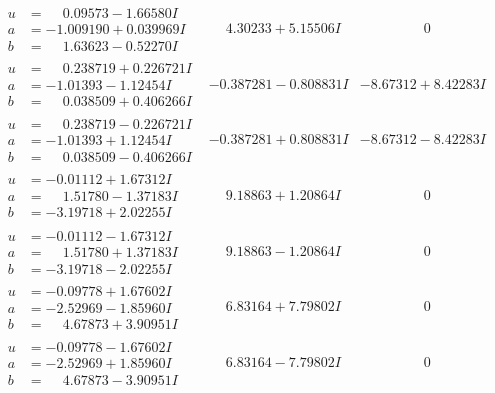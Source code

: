 \documentclass[1p]{elsarticle_modified}
\theoremstyle{definition}
\begin{document}
$$\begin{array}{c|c|c}
\begin{aligned}
u &= \phantom{-}0.09573 - 1.66580 I \\
a &= -1.009190 + 0.039969 I \\
b &= \phantom{-}1.63623 - 0.52270 I\end{aligned}
 & \phantom{-}4.30233 + 5.15506 I & \phantom{-0.000000 } 0 \\ \hline\begin{aligned}
u &= \phantom{-}0.238719 + 0.226721 I \\
a &= -1.01393 - 1.12454 I \\
b &= \phantom{-}0.038509 + 0.406266 I\end{aligned}
 & -0.387281 - 0.808831 I & -8.67312 + 8.42283 I \\ \hline\begin{aligned}
u &= \phantom{-}0.238719 - 0.226721 I \\
a &= -1.01393 + 1.12454 I \\
b &= \phantom{-}0.038509 - 0.406266 I\end{aligned}
 & -0.387281 + 0.808831 I & -8.67312 - 8.42283 I \\ \hline\begin{aligned}
u &= -0.01112 + 1.67312 I \\
a &= \phantom{-}1.51780 - 1.37183 I \\
b &= -3.19718 + 2.02255 I\end{aligned}
 & \phantom{-}9.18863 + 1.20864 I & \phantom{-0.000000 } 0 \\ \hline\begin{aligned}
u &= -0.01112 - 1.67312 I \\
a &= \phantom{-}1.51780 + 1.37183 I \\
b &= -3.19718 - 2.02255 I\end{aligned}
 & \phantom{-}9.18863 - 1.20864 I & \phantom{-0.000000 } 0 \\ \hline\begin{aligned}
u &= -0.09778 + 1.67602 I \\
a &= -2.52969 - 1.85960 I \\
b &= \phantom{-}4.67873 + 3.90951 I\end{aligned}
 & \phantom{-}6.83164 + 7.79802 I & \phantom{-0.000000 } 0 \\ \hline\begin{aligned}
u &= -0.09778 - 1.67602 I \\
a &= -2.52969 + 1.85960 I \\
b &= \phantom{-}4.67873 - 3.90951 I\end{aligned}
 & \phantom{-}6.83164 - 7.79802 I & \phantom{-0.000000 } 0 \\ \hline\begin{aligned}

\end{aligned}
\end{array}$$
\end{document}
